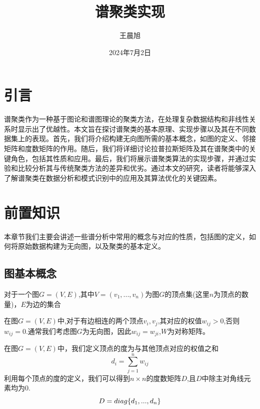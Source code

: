 \documentclass[11pt]{scrartcl}
\title{谱聚类实现}
\author{王晨旭\quad 1120223433}     %
\date{2024年7月2日}            %
\begin{document}
\maketitle
\section{引言}                                               
谱聚类作为一种基于图论和谱图理论的聚类方法，在处理复杂数据结构和非线性关系时显示出了优越性。本文旨在探讨谱聚类的基本原理、实现步骤以及其在不同数据集上的表现。首先，我们将介绍构建无向图所需的基本概念，如图的定义、邻接矩阵和度数矩阵的作用。随后，我们将详细讨论拉普拉斯矩阵及其在谱聚类中的关键角色，包括其性质和应用。最后，我们将展示谱聚类算法的实现步骤，并通过实验和比较分析其与传统聚类方法的差异和优劣。通过本文的研究，读者将能够深入了解谱聚类在数据分析和模式识别中的应用及其算法优化的关键因素。


\section{前置知识}
本章节我们主要会讲述一些谱分析中常用的概念与对应的性质，包括图的定义，如何将原始数据构建为无向图，以及聚类的基本定义。
\subsection{图基本概念}
\begin{definition}[图的定义]
对于一个图$G=(V,E)$,其中$V=(v_1,...,v_n)$为图$G$的顶点集(这里$n$为顶点的数量)，$E$为边的集合
\end{definition}                


\begin{definition}[邻接矩阵$W$]
在图$G=(V,E)$中,对于有边相连的两个顶点$v_i,v_j$,其对应的权值$w_{ij}>0$,否则$w_{ij}=0$.通常我们考虑图$G$为无向图，因此$w_{ij}=w_{ji}$,$W$为对称矩阵。
\end{definition}

\begin{definition}[度数矩阵D]
在图$G=(V,E)$中，我们定义顶点的度为与其他顶点对应的权值之和
$$
d_i=\sum_{j=1}^n w_{ij}
$$
利用每个顶点的度的定义，我们可以得到$n\times n$的度数矩阵$D$,且$D$中除主对角线元素均为0.
$$
D=\\diag\{d_1,...,d_n\}
$$
\end{definition}
\end{document}
